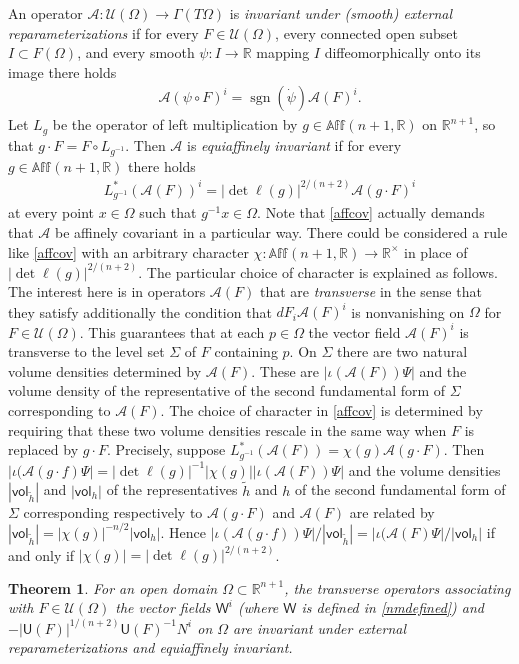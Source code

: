 \documentclass [leqno, 10pt]{amsart}
\newtheorem{theorem}{Theorem}[section]
\theoremstyle{definition}
\numberwithin{equation}{section}
\newcommand{\uinf}{\mathscr{U}}
\newcommand{\Om}{\Omega}
\newcommand{\imt}{\iota}
\newcommand{\A}{\mathscr{A}}
\newcommand{\U}{\mathsf{U}}
\newcommand{\vol}{\mathsf{vol}}
\newcommand{\nm}{\mathsf{W}}
\newcommand{\reat}{\mathbb{R}^{\times}}
\newcommand{\sign}{\operatorname{sgn}}
\newcommand{\Aff}{\mathbb{Aff}}
\newcommand{\rea}{\mathbb R}
\begin{document}
An operator $\A:\uinf(\Om) \to \Gamma(T\Om)$ is \textit{invariant under (smooth) external reparameterizations} if for every $F \in \uinf(\Om)$, every connected open subset $I \subset F(\Om)$, and every smooth $\psi:I \to \rea$ mapping $I$ diffeomorphically onto its image there holds
\begin{align}\label{extre}
\A(\psi \circ F)^{i} = \sign(\dot{\psi})\A(F)^{i}.
\end{align}
Let $L_{g}$ be the operator of left multiplication by $g \in \Aff(n+1, \rea)$ on $\rea^{n+1}$, so that $g \cdot F = F \circ L_{g^{-1}}$. Then $\A$ is \textit{equiaffinely invariant} if for every $g \in \Aff(n+1, \rea)$ there holds
\begin{align}\label{affcov}
L_{g^{-1}}^{\ast}(\A(F))^{i} = |\det \ell(g)|^{2/(n+2)}\A(g\cdot F)^{i}
\end{align}
at every point $x \in \Om$ such that $g^{-1}x \in \Om$. Note that \eqref{affcov} actually demands that $\A$ be affinely covariant in a particular way. There could be considered a rule like \eqref{affcov} with an arbitrary character $\chi:\Aff(n+1, \rea) \to \reat$ in place of $|\det \ell(g)|^{2/(n+2)}$. The particular choice of character is explained as follows. The interest here is in operators $\A(F)$ that are \textit{transverse} in the sense that they satisfy additionally the condition that $dF_{i}\A(F)^{i}$ is nonvanishing on $\Om$ for $F \in \uinf(\Om)$. This guarantees that at each $p \in \Om$ the vector field $\A(F)^{i}$ is transverse to the level set $\Sigma$ of $F$ containing $p$. On $\Sigma$ there are two natural volume densities determined by $\A(F)$. These are $|\imt(\A(F))\Psi|$ and the volume density of the representative of the second fundamental form of $\Sigma$ corresponding to $\A(F)$. The choice of character in \eqref{affcov} is determined by requiring that these two volume densities rescale in the same way when $F$ is replaced by $g \cdot F$. Precisely, suppose $L_{g^{-1}}^{\ast}(\A(F)) = \chi(g)\A(g\cdot F)$. Then $|\imt(\A(g\cdot f)\Psi| = |\det \ell(g)|^{-1}|\chi(g)||\imt(\A(F))\Psi|$ and the volume densities $|\vol_{\tilde{h}}|$ and $|\vol_{h}|$ of the representatives $\tilde{h}$ and $h$ of the second fundamental form of $\Sigma$ corresponding respectively to $\A(g\cdot F)$ and $\A(F)$ are related by $|\vol_{\tilde{h}}| = |\chi(g)|^{-n/2}|\vol_{h}|$. Hence $|\imt(\A(g\cdot f))\Psi|/|\vol_{\tilde{h}}| = |\imt(\A(F)\Psi|/|\vol_{h}|$ if and only if $|\chi(g)| = |\det \ell(g)|^{2/(n+2)}$.

\begin{theorem}\label{affinecovariancetheorem}
For an open domain $\Om \subset \rea^{n+1}$, the transverse operators associating with $F \in \uinf(\Om)$ the vector fields $\nm^{i}$ (where $\nm$ is defined in \eqref{nmdefined}) and
$-|\U(F)|^{1/(n+2)}\U(F)^{-1}N^{i}$ on $\Om$ are invariant under external reparameterizations and equiaffinely invariant. 
\end{theorem}
\end{document}
